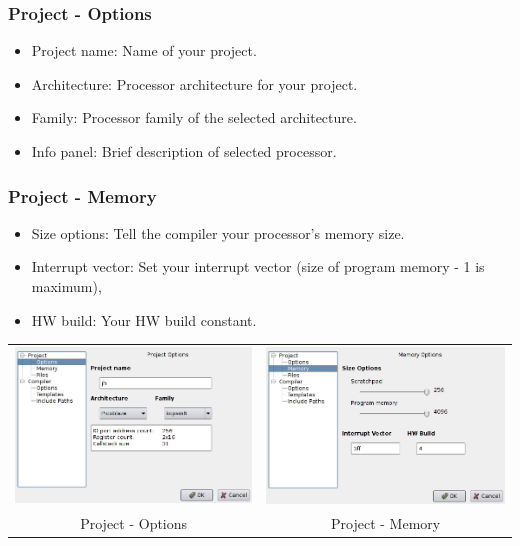         \subsubsection{Project - Options}
            \begin{itemize}
                \item Project name: Name of your project.
                \item Architecture: Processor architecture for your project.
                \item Family: Processor family of the selected architecture.
                \item Info panel: Brief description of selected processor.
            \end{itemize}

        \subsubsection{Project - Memory}
            \begin{itemize}
                \item Size options: Tell the compiler your processor's memory size.
                \item Interrupt vector: Set your interrupt vector (size of program memory - 1 is maximum),
                \item HW build: Your HW build constant.
            \end{itemize}
            \begin{table}[h!]
                \begin{tabular}{cc}
                    \includegraphics[width=.5\textwidth]{img/config2.png}
                        &
                    \includegraphics[width=.5\textwidth]{img/config1.png}
                        \\
                    Project - Options & Project - Memory
                \end{tabular}
            \end{table}


